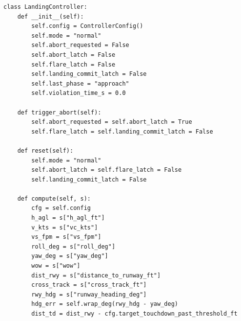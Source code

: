 \begin{verbatim}
class LandingController:
    def __init__(self):
        self.config = ControllerConfig()
        self.mode = "normal"
        self.abort_requested = False
        self.abort_latch = False
        self.flare_latch = False
        self.landing_commit_latch = False
        self.last_phase = "approach"
        self.violation_time_s = 0.0

    def trigger_abort(self):
        self.abort_requested = self.abort_latch = True
        self.flare_latch = self.landing_commit_latch = False

    def reset(self):
        self.mode = "normal"
        self.abort_latch = self.flare_latch = False
        self.landing_commit_latch = False

    def compute(self, s):
        cfg = self.config
        h_agl = s["h_agl_ft"]
        v_kts = s["vc_kts"]
        vs_fpm = s["vs_fpm"]
        roll_deg = s["roll_deg"]
        yaw_deg = s["yaw_deg"]
        wow = s["wow"]
        dist_rwy = s["distance_to_runway_ft"]
        cross_track = s["cross_track_ft"]
        rwy_hdg = s["runway_heading_deg"]
        hdg_err = self.wrap_deg(rwy_hdg - yaw_deg)
        dist_td = dist_rwy - cfg.target_touchdown_past_threshold_ft
\end{verbatim}
